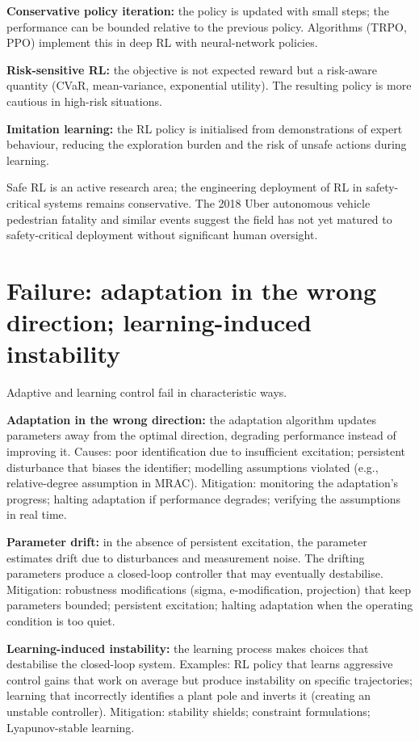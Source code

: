 \textbf{Conservative policy iteration:} the policy is updated with small steps; the performance can be bounded relative to the previous policy. Algorithms (TRPO, PPO) implement this in deep RL with neural-network policies.

\textbf{Risk-sensitive RL:} the objective is not expected reward but a risk-aware quantity (CVaR, mean-variance, exponential utility). The resulting policy is more cautious in high-risk situations.

\textbf{Imitation learning:} the RL policy is initialised from demonstrations of expert behaviour, reducing the exploration burden and the risk of unsafe actions during learning.

Safe RL is an active research area; the engineering deployment of RL in safety-critical systems remains conservative. The 2018 Uber autonomous vehicle pedestrian fatality and similar events suggest the field has not yet matured to safety-critical deployment without significant human oversight.

\section{Failure: adaptation in the wrong direction; learning-induced instability}

Adaptive and learning control fail in characteristic ways.

\textbf{Adaptation in the wrong direction:} the adaptation algorithm updates parameters away from the optimal direction, degrading performance instead of improving it. Causes: poor identification due to insufficient excitation; persistent disturbance that biases the identifier; modelling assumptions violated (e.g., relative-degree assumption in MRAC). Mitigation: monitoring the adaptation's progress; halting adaptation if performance degrades; verifying the assumptions in real time.

\textbf{Parameter drift:} in the absence of persistent excitation, the parameter estimates drift due to disturbances and measurement noise. The drifting parameters produce a closed-loop controller that may eventually destabilise. Mitigation: robustness modifications (sigma, e-modification, projection) that keep parameters bounded; persistent excitation; halting adaptation when the operating condition is too quiet.

\textbf{Learning-induced instability:} the learning process makes choices that destabilise the closed-loop system. Examples: RL policy that learns aggressive control gains that work on average but produce instability on specific trajectories; learning that incorrectly identifies a plant pole and inverts it (creating an unstable controller). Mitigation: stability shields; constraint formulations; Lyapunov-stable learning.

